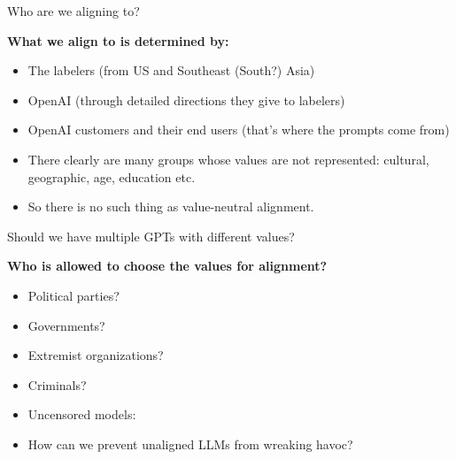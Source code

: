 \begin{vbframe}{Who are we aligning to?}

\vfill

\textbf{What we align to is determined by:}

	\begin{itemize}
		\item The labelers (from US and Southeast
		(South?) Asia)
		\item OpenAI (through detailed directions
		they give to labelers)
		\item OpenAI customers and their end users
		(that's where the prompts come from)
                \item There clearly are many groups whose
		values are not represented: cultural,
		geographic, age, education etc.
                \item So there is no such thing as
		value-neutral alignment.
	\end{itemize}

\vfill

\end{vbframe}

\begin{vbframe}{Should we have multiple GPTs with different values?}

\vfill

\textbf{Who is allowed to choose the values for alignment?}

	\begin{itemize}
		\item Political parties?
		\item Governments?
		\item Extremist organizations?
                \item Criminals?
                \item Uncensored models:
                \href{https://erichartford.com}{}
                \item \ques How can we prevent unaligned
		LLMs from wreaking havoc?
	\end{itemize}

\vfill

\end{vbframe}



